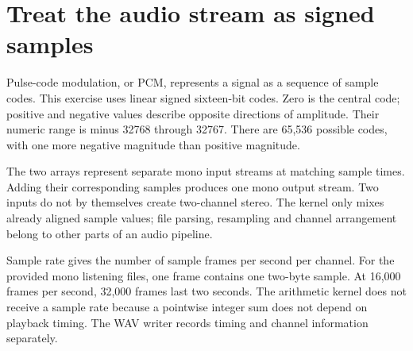 \section{Treat the audio stream as signed samples}\label{pcm-purpose}
Pulse-code modulation, or PCM, represents a signal as a sequence of sample codes.
This exercise uses linear signed sixteen-bit codes. Zero is the central code;
positive and negative values describe opposite directions of amplitude. Their
numeric range is minus 32768 through 32767. There are 65,536 possible codes, with
one more negative magnitude than positive magnitude.

The two arrays represent separate mono input streams at matching sample times.
Adding their corresponding samples produces one mono output stream. Two inputs
do not by themselves create two-channel stereo. The kernel only mixes already
aligned sample values; file parsing, resampling and channel arrangement belong to
other parts of an audio pipeline.

Sample rate gives the number of sample frames per second per channel. For the
provided mono listening files, one frame contains one two-byte sample. At 16,000
frames per second, 32,000 frames last two seconds. The arithmetic kernel does not
receive a sample rate because a pointwise integer sum does not depend on playback
timing. The WAV writer records timing and channel information separately.
